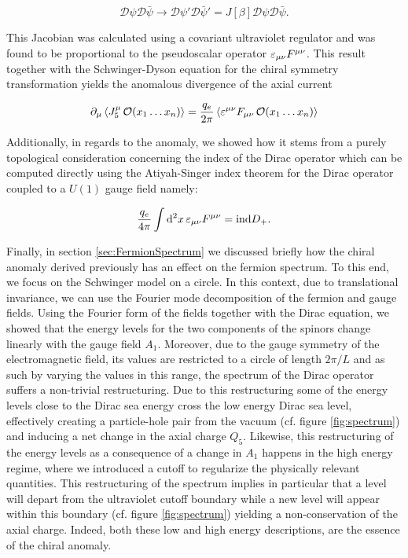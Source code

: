  \begin{equation*}
 	\mathcal{D}\psi \mathcal{D}\bar\psi \to \mathcal{D}\psi' \mathcal{D}\bar\psi' = J[\beta]\mathcal{D}\psi \mathcal{D}\bar\psi.
 \end{equation*}
 
 This Jacobian was calculated using a covariant ultraviolet regulator and was found to be proportional to the pseudoscalar operator $\varepsilon_{\mu\nu} F^{\mu\nu}$. This result together with the Schwinger-Dyson equation for the chiral symmetry transformation yields the anomalous divergence of the axial current
 
 \begin{equation*}
 	\partial_\mu \expval{J_5^\mu \,\mathcal{O}(x_1\ldots x_n)} = \frac{q_e}{2\pi}\expval{\varepsilon^{\mu\nu}F_{\mu\nu}\, \mathcal{O}(x_1\ldots x_n)}
 \end{equation*}
 
 Additionally, in regards to the anomaly, we showed how it stems from a purely topological consideration concerning the index of the Dirac operator which can be computed directly using the Atiyah-Singer index theorem for the Dirac operator coupled to a $U(1)$ gauge field namely:
 
 \begin{equation*}
 	\frac{q_e}{4\pi}\int\dd[2]{x}\varepsilon_{\mu\nu} F^{\mu\nu} = \text{ind} D_+.
 \end{equation*}
 
 Finally, in section \ref{sec:FermionSpectrum} we discussed briefly how the chiral anomaly derived previously has an effect on the fermion spectrum. To this end, we focus on the Schwinger model on a circle. In this context, due to translational invariance, we can use the Fourier mode decomposition of the fermion and gauge fields. Using the Fourier form of the fields together with the Dirac equation, we showed that the energy levels for the two components of the spinors change linearly with the gauge field $A_1$. Moreover, due to the gauge symmetry of the electromagnetic field, its values are restricted to a circle of length $2\pi/L$ and as such by varying the values in this range, the spectrum of the Dirac operator suffers a non-trivial restructuring. Due to this restructuring some of the energy levels close to the Dirac sea energy cross the low energy Dirac sea level, effectively creating a particle-hole pair from the vacuum (cf. figure \ref{fig:spectrum}) and inducing a net change in the axial charge $Q_5$. Likewise, this restructuring of the energy levels as a consequence of a change in $A_1$ happens in the high energy regime, where we introduced a cutoff to regularize the physically relevant quantities. This restructuring of the spectrum implies in particular that a level will depart from the ultraviolet cutoff boundary while a new level will appear within this boundary (cf. figure \ref{fig:spectrum}) yielding a non-conservation of the axial charge. Indeed, both these low and high energy descriptions, are the essence of the chiral anomaly.\\
 
